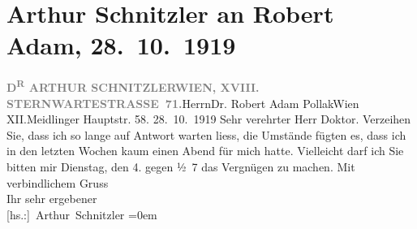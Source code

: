 

         
         \renewcommand{\erwaehntePersonen}{Personen: Robert Adam}
         \renewcommand{\erwaehnteOrte}{Orte: I., Innere Stadt, Meidlinger Hauptstraße, Sternwartestraße, Wien, XII., Meidling}
         \renewcommand{\erwaehnteWerke}{}
               \section[Arthur Schnitzler an Robert Adam, 28. 10. 1919]{ Arthur Schnitzler an Robert Adam, 28. 10. 1919}\nopagebreak{}\rehead{ }\begin{ledgroupsized}[t]{13cm}\normalsize\beginnumbering \toendnotes[C]{\smallbreak\pagebreak[2]} 
\pstart{}{\pb}\textcolor{gray}{\textbf{D\textsuperscript{R} ARTHUR SCHNITZLER}}\pend{}\pstart{}\textcolor{gray}{\textbf{WIEN, XVIII. STERNWARTESTRASSE 71.}}\pend{}{\bigskip}\pstart{}Herrn\pend{}\pstart{}Dr. Robert Adam Pollak\pend{}\pstart{}Wien XII.\pend{}\pstart{}Meidlinger Hauptstr. 58.\pend{}{\bigskip}\pstart
           \raggedleft{}{\pb}28. 10. 1919\pend
           \pstart{}Sehr verehrter Herr Doktor.\pend\pstart
           Verzeihen Sie, dass ich so lange auf Antwort warten liess, die Umstände fügten es,
               dass ich in den letzten Wochen kaum einen Abend für mich hatte. Vielleicht darf ich
               Sie bitten mir Dienstag, den 4. gegen ½ 7 das Vergnügen zu
               machen.\pend
           \pstart
           Mit verbindlichem Gruss{\\[\baselineskip]}Ihr sehr ergebener{\\[\baselineskip]}\spacefill\mbox{{[}hs.:{]} Arthur Schnitzler}\pend
           \leftskip=0em{}
         
         \endnumbering{}\end{ledgroupsized}  \newcommand{\dateiname}{L02330}\newcommand{\titel}{Arthur Schnitzler an Robert Adam, 28. 10. 1919}\newcommand{\editorInnen}{Martin Anton Müller und Gerd-Hermann Susen}
      